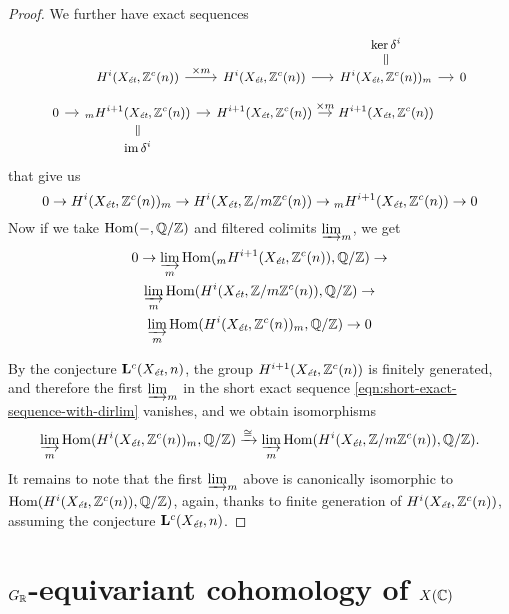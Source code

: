 \documentclass{article}
\numberwithin{equation}{section}
\begin{document}
\begin{proposition}
\begin{proof}
    We further have exact sequences
    \[ \begin{tikzcd}[row sep=0.8em,column sep=1em,font=\small]
      & & & \ker \delta^i\ar[equal]{d} \\
      & H^i (X_\et, \ZZ^c (n)) \ar{r}{\times m} & H^i (X_\et, \ZZ^c (n))\ar{r} & H^i (X_\et, \ZZ^c (n))_m \ar{r} & 0 \\
      0\ar{r} & {}_m H^{i+1} (X_\et, \ZZ^c (n)) \ar{r} & H^{i+1} (X_\et, \ZZ^c (n))\ar{r}{\times m} & H^{i+1} (X_\et, \ZZ^c (n)) \\
      & \im \delta^i\ar[equal]{u}
    \end{tikzcd} \]
    that give us
    \[ 0 \to H^i (X_\et, \ZZ^c (n))_m \to
    H^i (X_\et, \ZZ/m\ZZ^c (n)) \to
    {}_m H^{i+1} (X_\et, \ZZ^c (n)) \to 0 \]
    Now if we take $\Hom (-,\QQ/\ZZ)$ and filtered colimits $\varinjlim_m$,
    we get
    \begin{multline}
      \label{eqn:short-exact-sequence-with-dirlim}
      0 \to \varinjlim_m \Hom ({}_m H^{i+1} (X_\et, \ZZ^c (n)), \QQ/\ZZ) \to \\
      \varinjlim_m \Hom (H^i (X_\et, \ZZ/m\ZZ^c (n)), \QQ/\ZZ) \to \\
      \varinjlim_m \Hom (H^i (X_\et, \ZZ^c (n))_m, \QQ/\ZZ) \to 0
    \end{multline}

    By the conjecture $\mathbf{L}^c (X_\et, n)$, the group
    $H^{i+1} (X_\et, \ZZ^c (n))$ is finitely generated, and therefore
    the first $\varinjlim_m$ in the short exact sequence
    \eqref{eqn:short-exact-sequence-with-dirlim} vanishes, and we obtain
    isomorphisms
    \[ \varinjlim_m \Hom (H^i (X_\et, \ZZ^c (n))_m, \QQ/\ZZ) \xrightarrow{\cong}
    \varinjlim_m \Hom (H^i (X_\et, \ZZ/m\ZZ^c (n)), \QQ/\ZZ). \]
    It remains to note that the first $\varinjlim_m$ above is canonically
    isomorphic to $\Hom (H^i (X_\et, \ZZ^c (n)), \QQ/\ZZ)$, again,
    thanks to finite generation of $H^i (X_\et, \ZZ^c (n))$,
    assuming the conjecture $\mathbf{L}^c (X_\et, n)$.
  \end{proof}
\end{proposition}


\section{\texorpdfstring{$G_\RR$}{G\_ℝ}-equivariant cohomology of \texorpdfstring{$X (\CC)$}{X (ℂ)}}
\label{sec:GR-equivariant-cohomology}
\end{document}
